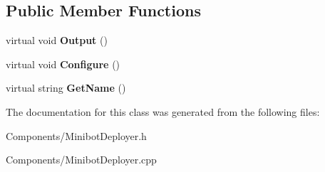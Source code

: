 \subsection*{\-Public \-Member \-Functions}
\begin{DoxyCompactItemize}
\item 
\hypertarget{class_minibot_deployer_a552b0d504c56bcfb4b60a0826eb1c208}{
virtual void {\bfseries \-Output} ()}
\label{class_minibot_deployer_a552b0d504c56bcfb4b60a0826eb1c208}

\item 
\hypertarget{class_minibot_deployer_af41fc04e8c4049b38555db94b39ff2db}{
virtual void {\bfseries \-Configure} ()}
\label{class_minibot_deployer_af41fc04e8c4049b38555db94b39ff2db}

\item 
\hypertarget{class_minibot_deployer_a7201dc7490bc3c67994c455e0222c481}{
virtual string {\bfseries \-Get\-Name} ()}
\label{class_minibot_deployer_a7201dc7490bc3c67994c455e0222c481}

\end{DoxyCompactItemize}


\-The documentation for this class was generated from the following files\-:\begin{DoxyCompactItemize}
\item 
\-Components/\-Minibot\-Deployer.\-h\item 
\-Components/\-Minibot\-Deployer.\-cpp\end{DoxyCompactItemize}
